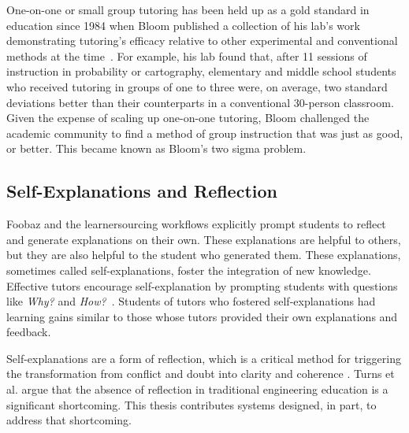 One-on-one or small group tutoring has been held up as a gold standard in education since 1984 when Bloom published a collection of his lab's work demonstrating tutoring's efficacy relative to other experimental and conventional methods at the time~\cite{bloom}. For example, his lab found that, after 11 sessions of instruction in probability or cartography, elementary and middle school students who received tutoring in groups of one to three were, on average, two standard deviations better than their counterparts in a conventional 30-person classroom. Given the expense of scaling up one-on-one tutoring, Bloom challenged the academic community to find a method of group instruction that was just as good, or better. This became known as Bloom's two sigma problem.

\subsection{Self-Explanations and Reflection}

Foobaz and the learnersourcing workflows explicitly prompt students to reflect and generate explanations on their own. These explanations are helpful to others, but they are also helpful to the student who generated them. These explanations, sometimes called self-explanations, foster the integration of new knowledge. Effective tutors encourage self-explanation by prompting students with questions like {\it Why?} and {\it How?}~\cite{selfexplanation}. Students of tutors who fostered self-explanations had learning gains similar to those whose tutors provided their own explanations and feedback\cite{chi2001learning}. 

Self-explanations are a form of reflection, which is a critical method for triggering the transformation from conflict and doubt into clarity and coherence \cite{dewey1933}. Turns et al. \cite{asee} argue that the absence of reflection in traditional engineering education is a significant shortcoming. This thesis contributes systems designed, in part, to address that shortcoming.


